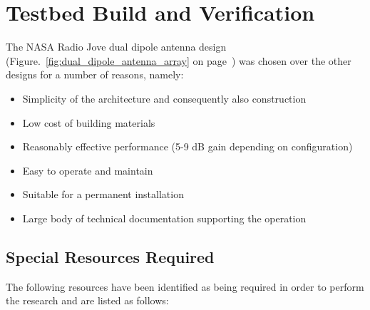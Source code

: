 \newpage
\chapter*{Testbed Build and Verification}
The NASA Radio Jove dual dipole antenna design (Figure.~\ref{fig:dual_dipole_antenna_array} on page~\pageref{fig:dual_dipole_antenna_array}) was chosen over the other designs for a number of reasons, namely:

\begin{itemize}
	\item Simplicity of the architecture and consequently also construction
	\item Low cost of building materials
	\item Reasonably effective performance (5-9 dB gain depending on configuration)
	\item Easy to operate and maintain
	\item Suitable for a permanent installation
	\item Large body of technical documentation supporting the operation
\end{itemize}


\section*{Special Resources Required}

The following resources have been identified as being required in order to perform the research and are listed as follows:

